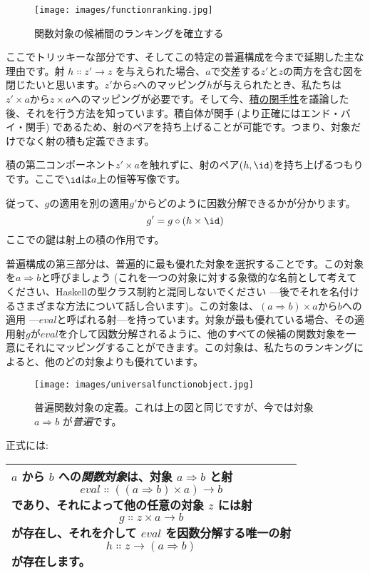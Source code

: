 \begin{figure}[H]
  \centering
  \texttt{[image: images/functionranking.jpg]}
  \caption{関数対象の候補間のランキングを確立する}
\end{figure}

\noindent
ここでトリッキーな部分です、そしてこの特定の普遍構成を今まで延期した主な理由です。射 $h \Colon z'\to z$ を与えられた場合、$a$で交差する$z'$と$z$の両方を含む図を閉じたいと思います。$z'$から$z$へのマッピング$h$が与えられたとき、私たちは$z' \times a$から$z \times a$へのマッピングが必要です。そして今、\hyperref[functoriality]{積の関手性}を議論した後、それを行う方法を知っています。積自体が関手 (より正確にはエンド・バイ・関手) であるため、射のペアを持ち上げることが可能です。つまり、対象だけでなく射の積も定義できます。

積の第二コンポーネント$z' \times a$を触れずに、射のペア$(h, \id)$を持ち上げるつもりです。ここで$\id$は$a$上の恒等写像です。

従って、$g$の適用を別の適用$g'$からどのように因数分解できるかが分かります。
\[g' = g \circ (h \times \id)\]
ここでの鍵は射上の積の作用です。

普遍構成の第三部分は、普遍的に最も優れた対象を選択することです。この対象を$a \Rightarrow b$と呼びましょう (これを一つの対象に対する象徴的な名前として考えてください、Haskellの型クラス制約と混同しないでください ---後でそれを名付けるさまざまな方法について話し合います)。この対象は、$(a \Rightarrow b) \times a$から$b$への適用 ---$\mathit{eval}$と呼ばれる射---を持っています。対象が最も優れている場合、その適用射$g$が$\mathit{eval}$を介して因数分解されるように、他のすべての候補の関数対象を一意にそれにマッピングすることができます。この対象は、私たちのランキングによると、他のどの対象よりも優れています。

\begin{figure}[H]
  \centering
  \texttt{[image: images/universalfunctionobject.jpg]}
  \caption{普遍関数対象の定義。これは上の図と同じですが、今では対象 $a \Rightarrow b$ が\emph{普遍}です。}
\end{figure}

\noindent
正式には:

\begin{longtable}[]{@{}l@{}}
  \toprule
  \begin{minipage}[t]{0.97\columnwidth}\raggedright\strut
    $a$ から $b$ への\emph{関数対象}は、対象
    $a \Rightarrow b$ と射
    \[\mathit{eval} \Colon ((a \Rightarrow b) \times a) \to b\]
    であり、それによって他の任意の対象 $z$ には射
    \[g \Colon z \times a \to b\]
    が存在し、それを介して $\mathit{eval}$ を因数分解する唯一の射
    \[h \Colon z \to (a \Rightarrow b)\]
    が存在します。
  \end{minipage}\tabularnewline
  \bottomrule
\end{longtable}

